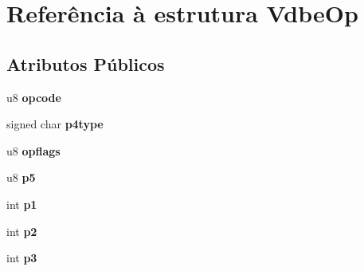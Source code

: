 \hypertarget{struct_vdbe_op}{\section{Referência à estrutura Vdbe\-Op}
\label{struct_vdbe_op}
}
\subsection*{Atributos Públicos}
\begin{DoxyCompactItemize}
\item 
\hypertarget{struct_vdbe_op_ae12a8e7a8f5f7ba39fa379c9ad287837}{u8 {\bfseries opcode}}\label{struct_vdbe_op_ae12a8e7a8f5f7ba39fa379c9ad287837}

\item 
\hypertarget{struct_vdbe_op_a124dee58d3e0d73c7dfaf811a3311023}{signed char {\bfseries p4type}}\label{struct_vdbe_op_a124dee58d3e0d73c7dfaf811a3311023}

\item 
\hypertarget{struct_vdbe_op_a169a7bbe99a90c26ee01833723750b1d}{u8 {\bfseries opflags}}\label{struct_vdbe_op_a169a7bbe99a90c26ee01833723750b1d}

\item 
\hypertarget{struct_vdbe_op_a5e807981f52d29c06a5b6d4a8f2f4595}{u8 {\bfseries p5}}\label{struct_vdbe_op_a5e807981f52d29c06a5b6d4a8f2f4595}

\item 
\hypertarget{struct_vdbe_op_a17c8326a1e3ac5612d4aaaa88f383b3b}{int {\bfseries p1}}\label{struct_vdbe_op_a17c8326a1e3ac5612d4aaaa88f383b3b}

\item 
\hypertarget{struct_vdbe_op_aba021fa9d30343c16794d9b76d8bffcd}{int {\bfseries p2}}\label{struct_vdbe_op_aba021fa9d30343c16794d9b76d8bffcd}

\item 
\hypertarget{struct_vdbe_op_ad7ef3319da20d5423b8cc5da6995d193}{int {\bfseries p3}}\label{struct_vdbe_op_ad7ef3319da20d5423b8cc5da6995d193}


\end{DoxyCompactItemize}
